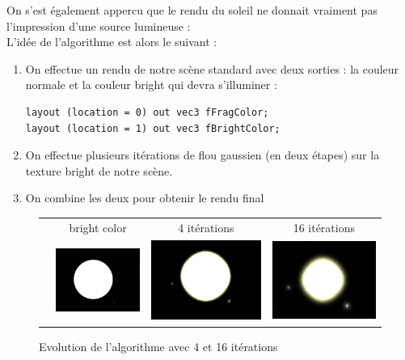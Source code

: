 \documentclass[11pt,a4paper]{article}
\begin{document}
On s'est également appercu que le rendu du soleil ne donnait vraiment pas l'impression d'une source lumineuse :\\
L'idée de l'algorithme est alors le suivant :\\
\begin{enumerate}
\item On effectue un rendu de notre scène standard avec deux sorties : la couleur normale et la couleur bright qui devra s'illuminer :
\begin{lstlisting}
layout (location = 0) out vec3 fFragColor;
layout (location = 1) out vec3 fBrightColor;
\end{lstlisting}
\item On effectue plusieurs itérations de flou gaussien (en deux étapes) sur la texture bright de notre scène.
\item On combine les deux pour obtenir le rendu final
\end{enumerate}
\begin{figure}[h!]
\centering
\begin{tabular}{l|c|c|c|}
    & bright color & 4 itérations & 16 itérations \\
   & \includegraphics[width=0.30\columnwidth]{img/b1.png} & \includegraphics[width=0.30\columnwidth]{img/b4.png} & \includegraphics[width=0.30\columnwidth]{img/b16.png}  \\
\end{tabular}
\caption{Evolution de l'algorithme avec 4 et 16 itérations }
\end{figure}
\end{document}

